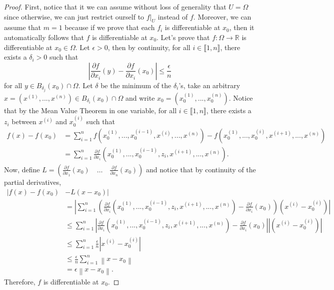 \documentclass{article}
\theoremstyle{plain}
\theoremstyle{definition}
\newcommand{\R}{\mathbb{R}}
\newcommand{\Iint}[2]{\llbracket #1 , #2 \rrbracket}
\newcommand{\norm}[1]{\left\lVert#1 \right\rVert}
\begin{document}
\begin{proof}
    First, notice that it we can assume without loss of generality that $U = \Omega$ since otherwise, we can just restrict ourself to $f|_U$ instead of $f$. Moreover, we can assume that $m =1$ because if we prove that each $f_i$ is differentiable at $x_0$, then it automatically follows that $f$ is differentiable at $x_0$. Let's prove that $f : \Omega \to \R$ is differentiable at $x_0 \in \Omega$. Let $\epsilon > 0$, then by continuity, for all $i \in \Iint{1}{n}$, there exists a $\delta_i > 0$ such that 
    $$\left|\frac{\partial f}{\partial x_i}(y) - \frac{\partial f}{\partial x_i}(x_0)\right| \leq \frac{\epsilon}{n}$$
    for all $y \in B_{\delta_j}(x_0)\cap \Omega$. Let $\delta$ be the minimum of the $\delta_i$'s, take an arbitrary $x = (x^{(1)}, ..., x^{(n)}) \in B_{\delta_i}(x_0)\cap \Omega$ and write $x_0 = (x_0^{(1)}, ..., x_0^{(n)})$. Notice that by the Mean Value Theorem in one variable, for all $i \in \Iint{1}{n}$, there exists a $z_i$ between $x^{(i)}$ and $x_0^{(i)}$ such that
    \begin{align*}
        f(x) - f(x_0) &= \sum_{i=1}^{n}f(x_0^{(1)}, ..., x_0^{(i-1)}, x^{(i)}, ..., x^{(n)}) - f(x_0^{(1)}, ..., x_0^{(i)}, x^{(i+1)}, ..., x^{(n)}) \\
        &= \sum_{i=1}^{n}\frac{\partial f}{\partial x_i}(x_0^{(1)}, ..., x_0^{(i-1)}, z_i, x^{(i+1)}, ..., x^{(n)}).
    \end{align*}
    Now, define $L = \left(\frac{\partial f}{\partial x_1}(x_0) \quad \dots \quad \frac{\partial f}{\partial x_n}(x_0)\right)$ and notice that by continuity of the partial derivatives,
    \begin{align*}
        |f(x) - f(x_0)& - L(x - x_0)| \\
        &= \left|\sum_{i=1}^{n} \left(\frac{\partial f}{\partial x_i}(x_0^{(1)}, ..., x_0^{(i-1)}, z_i, x^{(i+1)}, ..., x^{(n)}) - \frac{\partial f}{\partial x_i}(x_0)\right)(x^{(i)} - x_0^{(i)})\right| \\
        &\leq \sum_{i=1}^{n} \left|\frac{\partial f}{\partial x_i}(x_0^{(1)}, ..., x_0^{(i-1)}, z_i, x^{(i+1)}, ..., x^{(n)}) - \frac{\partial f}{\partial x_i}(x_0)\right| |(x^{(i)} - x_0^{(i)})| \\
        &\leq \sum_{i=1}^{n}\frac{\epsilon}{n}|x^{(i)}-x_0^{(i)}| \\
        &\leq \frac{\epsilon}{n} \sum_{i=1}^{n}\norm{x - x_0} \\
        &= \epsilon\norm{x - x_0}.
    \end{align*}
    Therefore, $f$ is differentiable at $x_0$. 
\end{proof}
\end{document}
